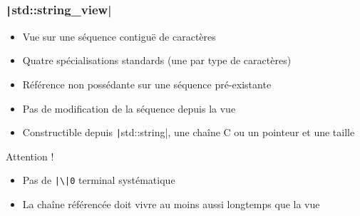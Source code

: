 \documentclass[C++.tex]{subfiles}
\begin{document}
\begin{frame}[fragile]
	\frametitle{\texttt|std::string_view|}
	\begin{itemize}
		\item Vue sur une séquence contiguë de caractères
		\item Quatre spécialisations standards (une par type de caractères)
		\item Référence non possédante sur une séquence pré-existante
		\item Pas de modification de la séquence depuis la vue
		\item Constructible depuis \texttt|std::string|, une chaîne C ou un pointeur et une taille
	\end{itemize}

	\begin{alertblock}{Attention !}
		\begin{itemize}
			\item Pas de \texttt{|\textbackslash|0} terminal systématique
			\item La chaîne référencée doit vivre au moins aussi longtemps que la vue
		\end{itemize}
	\end{alertblock}

\end{frame}
\end{document}
